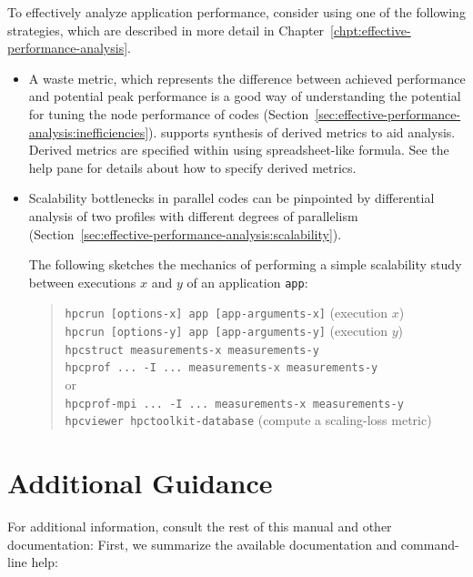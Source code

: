 \documentclass[11pt,twoside,letterpaper]{report}
\begin{document}
To effectively analyze application performance, consider using one of the following strategies, which are described in more detail in Chapter~\ref{chpt:effective-performance-analysis}.
\begin{itemize}
\item
A waste metric, which represents the difference between achieved performance and potential peak performance is a good way of understanding the potential for tuning the node performance of codes (Section~\ref{sec:effective-performance-analysis:inefficiencies}).
\hpcviewer{} supports synthesis of derived metrics to aid analysis.
Derived metrics are specified within \hpcviewer{} using spreadsheet-like formula.
See the \hpcviewer{} help pane for details about how to specify derived metrics.

\item
Scalability bottlenecks in parallel codes can be pinpointed by differential analysis of two profiles with different degrees of parallelism (Section~\ref{sec:effective-performance-analysis:scalability}).

The following sketches the mechanics of performing a simple scalability study between executions $x$ and $y$ of an application \texttt{app}:
\begin{quote}
  \verb|hpcrun [options-x] app [app-arguments-x]| \hfill (execution $x$) \\
  \verb|hpcrun [options-y] app [app-arguments-y]| \hfill (execution $y$) \\
  \verb|hpcstruct measurements-x measurements-y| \\
  \verb|hpcprof ... -I ... measurements-x measurements-y| \\
		or \\
  \verb|hpcprof-mpi ... -I ... measurements-x measurements-y| \\
  \verb|hpcviewer hpctoolkit-database| \hfill (compute a scaling-loss metric)
\end{quote}

\end{itemize}



\section{Additional Guidance}

For additional information, consult the rest of this manual and other documentation:
First, we summarize the available documentation and command-line help:
\end{document}
